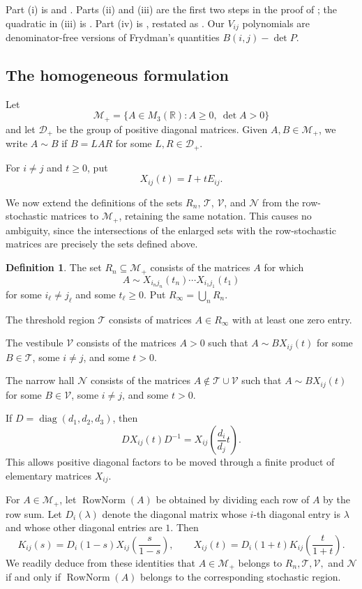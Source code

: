 \documentclass[11pt,onecolumn]{amsart}
\theoremstyle{plain}
\theoremstyle{definition}
\newtheorem{definition}[theorem]{Definition}
\theoremstyle{remark}
\newcommand{\RowNorm}{\operatorname{RowNorm}}
\newcommand{\T}{\mathcal T}
\newcommand{\V}{\mathcal V}
\newcommand{\NH}{\mathcal N}
\begin{document}
Part (i) is  \cite[Theorem 3.1]{FrydmanEmbedding1980}
and \cite[Lemma~2.1]{Frydman1980}.
Parts (ii) and (iii) are the first two steps in the proof of
\cite[Theorem~2.1]{Frydman1980}; the quadratic in (iii) is
\cite[Equation~(2.2)]{Frydman1980}. Part (iv) is
\cite[Theorem~2.1]{Frydman1980}, restated as
\cite[Theorem~1.1]{Frydman1983}. Our $V_{ij}$ polynomials are denominator-free
versions of Frydman's quantities $B(i,j)-\det P$.


\subsection{The homogeneous formulation}

Let
\[
\mathcal M_+=\{A\in M_3(\mathbb R):A\geq0,\ \det A>0\}
\]
and let $\mathcal D_+$ be the group of positive diagonal matrices.  Given $A,B\in \mathcal M_+$, we
write $A\sim B$ if $B=LAR$ for some $L,R\in\mathcal D_+$.

For $i\neq j$ and $t\geq0$, put
\[
X_{ij}(t)=I+tE_{ij}.
\]

We now extend the definitions of the sets $R_n$, $\T$, $\V$, and $\NH$ from the row-stochastic matrices to  $\mathcal M_+$, retaining the same notation. This causes no ambiguity, since the intersections of the enlarged sets with the row-stochastic matrices are precisely the sets defined above.


\begin{definition}
	The set $R_n\subseteq\mathcal M_+$ consists of the matrices $A$ for which
	\[
	A\sim
	X_{i_nj_n}(t_n)\cdots X_{i_1j_1}(t_1)
	\]
	for some $i_\ell\neq j_\ell$ and some $t_\ell\geq0$. Put
	$R_\infty=\bigcup_nR_n$.
	
	The threshold region $\T$ consists of matrices $A\in R_\infty$ with at least one zero entry.
	
	
	The vestibule $\V$  consists of the matrices $A>0$ such that $A\sim B X_{ij}(t)$
	for some $B\in\T$, some $i\neq j$, and some $t>0$.
	
	The narrow hall $\NH$ consists of the matrices $A\notin\T\cup\V$ such that $A\sim B X_{ij}(t)$
	for some $B\in\V$, some $i\neq j$, and some $t>0$.
\end{definition}

If $D=\operatorname{diag}(d_1,d_2,d_3)$, then
\[
	DX_{ij}(t)D^{-1}=X_{ij}\left(\frac{d_i}{d_j}t\right).
\]
This allows 
positive diagonal factors to be moved through a finite product of elementary matrices $X_{ij}$. 


For $A\in\mathcal M_+$, let $\RowNorm(A)$ be obtained by dividing each
row of $A$ by the row sum.  Let $D_i(\lambda)$ denote the diagonal matrix whose $i$-th diagonal
entry is $\lambda$ and whose other diagonal entries are $1$. Then
\[
K_{ij}(s)=D_i(1-s)X_{ij}\left(\frac{s}{1-s}\right),
\qquad
X_{ij}(t)=D_i(1+t)K_{ij}\left(\frac{t}{1+t}\right).
\]
We readily deduce from these identities that  $A\in\mathcal M_+$ belongs to
$R_n,\T,\V,$ and $\NH$ if and only if $\RowNorm(A)$ belongs to the
corresponding stochastic region.
\end{document}
